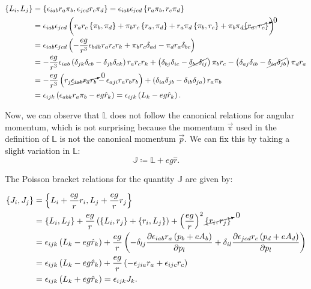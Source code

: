 \begin{align*}
\left\lbrace L_i, L_j \right\rbrace &= \left\lbrace \epsilon_{iab}r_a\pi_b, \epsilon_{jcd}r_c\pi_d \right\rbrace = \epsilon_{iab}\epsilon_{jcd}\left\lbrace r_a\pi_b, r_c\pi_d \right\rbrace\\
&= \epsilon_{iab}\epsilon_{jcd}\left( r_ar_c\left\lbrace \pi_b, \pi_d \right\rbrace+\pi_br_c\left\lbrace r_a, \pi_d \right\rbrace            +r_a\pi_d\left\lbrace \pi_b, r_c \right\rbrace + \pi_b\pi_d\cancelto{0}{\left\lbrace r_a, r_c \right\rbrace} \right)\\
&= \epsilon_{iab}\epsilon_{jcd}\left( -\frac{eg}{r^3}\epsilon_{bdk}r_ar_cr_k+\pi_br_c\delta_{ad}-\pi_dr_a\delta_{bc} \right)\\
&= -\frac{eg}{r^3}\epsilon_{iab}\left( \delta_{jk}\delta_{cb} - \delta_{jb}\delta_{ck} \right)r_ar_cr_k + \left( \delta_{bj}\delta_{ic} - \cancel{\delta_{bc}\delta_{ij}} \right)\pi_br_c - \left( \delta_{aj}\delta_{ib} - \cancel{\delta_{ia}\delta_{jb}} \right)\pi_dr_a\\
& = -\frac{eg}{r^3}\left( r_j\cancelto{0}{\epsilon_{iab}r_ar_b}-\epsilon_{aji}r_a{r_br_b} \right)             +\left( \delta_{ia}\delta_{jb}-\delta_{ib}\delta_{ja} \right)r_a\pi_b\\
& = \epsilon_{ijk}\left( \epsilon_{abk}r_a\pi_b-{eg}\hat{r}_k \right) = \epsilon_{ijk}\left( L_k-{eg}\hat{r}_k \right).
\end{align*}

Now, we can observe that $\mathbb{L}$ does not follow the canonical relations for angular momentum, which is not surprising because the momentum $\vec{\pi}$ used in the definition of $\mathbb{L}$ is not the canonical momentum $\vec{p}$. We can fix this by taking a slight variation in $\mathbb{L}$:\\

\begin{equation}
\mathbb{J} \coloneqq \mathbb{L} + eg\hat{r}.
\label{eq:ham poincarevec}
\end{equation}

The Poisson bracket relations for the quantity $\mathbb{J}$ are given by:

\begin{align*}
\left\lbrace J_i, J_j \right\rbrace &= \left\lbrace L_i + \frac{eg}{r}r_i, L_j + \frac{eg}{r}r_j \right\rbrace\\
&= \left\lbrace L_i, L_j \right\rbrace + \frac{eg}{r}\left( \left\lbrace L_i, r_j \right\rbrace +\left\lbrace r_i, L_j \right\rbrace \right) + \left( \frac{eg}{r} \right)^2\cancelto{0}{\left\lbrace r_i, r_j \right\rbrace}\\
& = \epsilon_{ijk}\left( L_k-{eg}\hat{r}_k \right)+\frac{eg}{r}\left( -\delta_{lj}\frac{\partial \epsilon_{iab}r_a\left( p_b+eA_b \right)}{\partial p_l}+ \delta_{il}\frac{\partial\epsilon_{jcd}r_c\left( p_d+eA_d \right)}{\partial p_l} \right)\\
& = \epsilon_{ijk}\left( L_k-{eg}\hat{r}_k \right)+ \frac{eg}{r}\left( -\epsilon_{jia}r_a+\epsilon_{ijc}r_c \right)\\
&= \epsilon_{ijk}\left( L_k+{eg}\hat{r}_k \right) = \epsilon_{ijk}J_k.
\end{align*}

